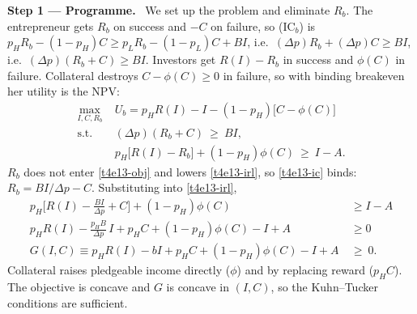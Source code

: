 \documentclass[11pt,a4paper]{article}
\newcommand{\step}[2]{\par\medskip\noindent\textbf{Step #1 --- #2.}~}
\begin{document}
\step{1}{Programme} We set up the problem and eliminate $R_b$. The entrepreneur gets $R_b$ on
success and $-C$ on failure, so (IC$_b$) is
$p_HR_b-(1-p_H)C\ge p_LR_b-(1-p_L)C+BI$, i.e.\ $(\Delta p)R_b+(\Delta p)C\ge BI$, i.e.\
$(\Delta p)(R_b+C)\ge BI$. Investors get $R(I)-R_b$ in success and $\phi(C)$ in failure. Collateral
destroys $C-\phi(C)\ge0$ in failure, so with binding breakeven her utility is the NPV:
\begin{align}
  \max_{I,C,R_b}\; & U_b=p_HR(I)-I-(1-p_H)\big[C-\phi(C)\big] \label{t4e13-obj}\\
  \text{s.t. }\; & (\Delta p)(R_b+C)\ \ge\ BI, \tag{IC$_b$}\label{t4e13-ic}\\
  & p_H\big[R(I)-R_b\big]+(1-p_H)\phi(C)\ \ge\ I-A. \tag{IR$_l$}\label{t4e13-irl}
\end{align}
$R_b$ does not enter \eqref{t4e13-obj} and lowers \eqref{t4e13-irl}, so \eqref{t4e13-ic} binds:
$R_b=BI/\Delta p-C$. Substituting into \eqref{t4e13-irl},
\begin{align}
  p_H\Big[R(I)-\frac{BI}{\Delta p}+C\Big]+(1-p_H)\phi(C) &\ge I-A \nonumber\\
  p_HR(I)-\frac{p_HB}{\Delta p}\,I+p_HC+(1-p_H)\phi(C)-I+A &\ge 0 \nonumber\\
  G(I,C)\equiv p_HR(I)-bI+p_HC+(1-p_H)\phi(C)-I+A\ &\ge\ 0. \label{t4e13-G}
\end{align}
Collateral raises pledgeable income directly ($\phi$) and by replacing reward ($p_HC$).
The objective is concave and $G$ is concave in $(I,C)$, so the Kuhn--Tucker conditions are sufficient.
\end{document}
